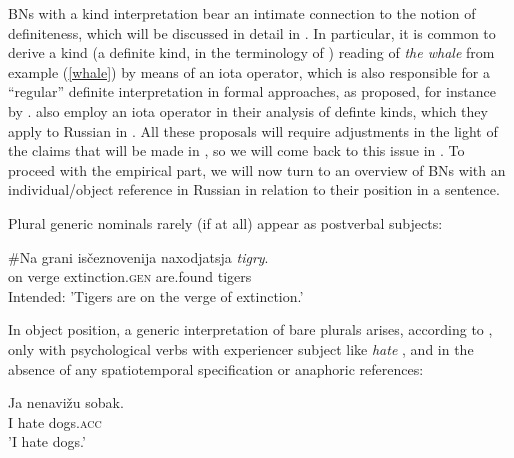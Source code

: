 \documentclass[output=paper,colorlinks,citecolor=brown]{langscibook}
\begin{document}
BNs with a kind interpretation bear an intimate connection to the notion of definiteness, which will be discussed in detail in . In particular, it is common to derive a kind (a definite kind, in the terminology of \citealt{borikespinal15}) reading of \textit{the whale} from example (\ref{whale}) by means of an iota operator, which is also responsible for a ``regular'' definite interpretation in formal approaches, as proposed, for instance by \citet{chierchia98,dayal04}. \citet{borikespinal15} also employ an iota operator in their analysis of definte kinds, which they apply to Russian in \citet{borikespinal19, borikespinal20}. All these proposals will require adjustments in the light of the claims that will be made in , so we will come back to this issue in . To proceed with the empirical part, we will now turn to an overview of BNs with an individual/object reference in Russian in relation to their position in a sentence. 

\iffalse
Plural generic nominals rarely (if at all) appear as postverbal subjects: 

\ea  \gll $\#$Na grani is\v{c}eznovenija naxodjatsja \textit{tigry}. \label{postverbalsubR} \\
on verge extinction.\textsc{gen} are.found tigers \\
\glt Intended: 'Tigers are on the verge of extinction.'
\z

\noindent In object position, a generic interpretation of bare plurals arises, according to \citet{seres20}, only with psychological verbs with experiencer subject like \textit{hate} \citep[cf.][]{belettirizzi88}, and in the absence of any spatiotemporal specification or anaphoric references: 

\ea \gll  
Ja nenavi\v{z}u sobak. \label{nenavizhusobak} \\
I hate dogs.\textsc{acc} \\
\glt 'I hate dogs.'
\z
\end{document}
